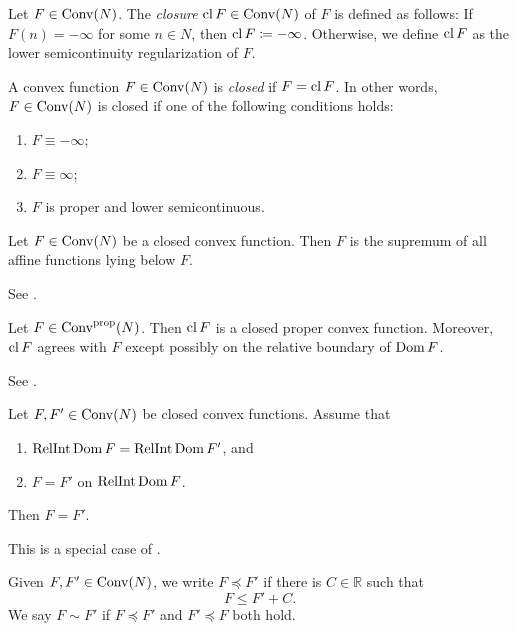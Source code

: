 \begin{definition}\label{def:convexclosure}
    Let $F\in \mathrm{Conv}(N)$. The \emph{closure} $\operatorname{cl} F\in \mathrm{Conv}(N)$ of $F$ is defined as follows: If $F(n)=-\infty$ for some $n\in N$, then $\operatorname{cl} F\coloneqq -\infty$. Otherwise, we define $\operatorname{cl} F$ as the lower semicontinuity regularization of $F$.

    A convex function $F\in \mathrm{Conv}(N)$ is \emph{closed} if $F=\operatorname{cl} F$. In other words, $F\in \mathrm{Conv}(N)$ is closed if one of the following conditions holds:
    \begin{enumerate}
        \item\label{itm:def:convexclosure:1} $F\equiv -\infty$;
        \item\label{itm:def:convexclosure:2} $F\equiv \infty$;
        \item\label{itm:def:convexclosure:3} $F$ is proper and lower semicontinuous.
    \end{enumerate}
\end{definition}
\begin{proposition}
    Let $F\in \mathrm{Conv}(N)$ be a closed convex function. Then $F$ is the supremum of all affine functions lying below $F$.
\end{proposition}
See \cite[Theorem~12.1]{Roc70}.

\begin{theorem}\label{thm:closurepropconv}
    Let $F\in \mathrm{Conv}^{\mathrm{prop}}(N)$. Then $\operatorname{cl} F$ is a closed proper convex function. Moreover, $\operatorname{cl} F$ agrees with $F$ except possibly on the relative boundary of $\operatorname{Dom} F$.
\end{theorem}
See \cite[Theorem~7.4]{Roc70}.

\begin{proposition}\label{prop:closedcvx_domain}
    Let $F,F'\in \mathrm{Conv}(N)$ be closed convex functions. Assume that
    \begin{enumerate}
        \item\label{itm:prop:closedcvx_domain:1} $\operatorname{RelInt} \operatorname{Dom} F=\operatorname{RelInt} \operatorname{Dom} F'$, and
        \item\label{itm:prop:closedcvx_domain:2} $F=F'$ on $\operatorname{RelInt} \operatorname{Dom} F$.
    \end{enumerate}
    Then $F=F'$.
\end{proposition}
This is a special case of \cite[Corollary~7.3.4]{Roc70}.

\begin{definition}\label{def:partialorderconv}
    Given $F,F'\in \mathrm{Conv}(N)$, we write $F\preceq F'$ if there is $C\in \mathbb{R}$ such that
    \[
        F\leq F'+C.
    \]
    We say $F\sim F'$ if $F\preceq F'$ and $F'\preceq F$ both hold.
\end{definition}

